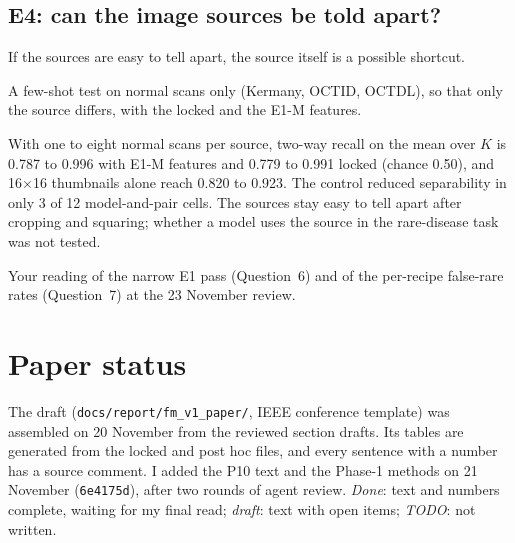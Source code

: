 \documentclass[10pt,a4paper]{article}
\newcommand{\file}[1]{\texttt{\small #1}}
\newcommand{\hash}[1]{\texttt{\footnotesize #1}}
\newenvironment{parts}{\begin{description}[style=unboxed, leftmargin=0pt, itemsep=3pt, font=\normalfont\bfseries\itshape]}{\end{description}}
\newenvironment{topic}[2]{\subsection{#1}\label{#2}\begin{parts}}{\end{parts}}
\begin{document}
\begin{topic}{E4: can the image sources be told apart?}{sec:e4}
\item[The problem.] If the sources are easy to tell apart, the source itself is a possible shortcut.
\item[What I did.] A few-shot test on normal scans only (Kermany, OCTID, OCTDL), so that only the source differs,
with the locked and the E1-M features.
\item[Result.] With one to eight normal scans per source, two-way recall on the mean over $K$ is 0.787 to 0.996 with
E1-M features and 0.779 to 0.991 locked (chance 0.50), and 16$\times$16 thumbnails alone reach 0.820 to 0.923. The control reduced separability in only 3 of 12 model-and-pair
cells. The sources stay easy to tell apart after cropping and squaring; whether a model uses the source in the
rare-disease task was not tested.
\item[What I need from you.] Your reading of the narrow E1 pass (Question~6) and of the per-recipe false-rare
rates (Question~7) at the 23 November review.
\end{topic}

\section{Paper status}

The draft (\file{docs/report/fm\_v1\_paper/}, IEEE conference template) was assembled on 20 November from the
reviewed section drafts. Its tables are generated from the locked and post hoc files, and every sentence with a
number has a source comment. I added the P10 text and the Phase-1 methods on 21 November (\hash{6e4175d}), after
two rounds of agent review. \emph{Done}: text and numbers complete, waiting for my final read; \emph{draft}: text
with open items; \emph{TODO}: not written.
\end{document}
